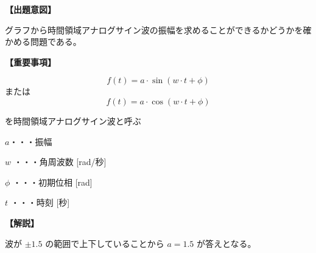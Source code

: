 \noindent \textbf{【出題意図】}

\noindent グラフから時間領域アナログサイン波の振幅を求めることができるかどうかを確かめる問題である。

\vspace{1em}
\noindent \textbf{【重要事項】}

\[
f(t) = a \cdot \sin( w \cdot t + \phi )
\]
%
\noindent または
%
\[
f(t) = a \cdot \cos( w \cdot t + \phi )
\]

\medskip
\noindent を時間領域アナログサイン波と呼ぶ

\bigskip
\noindent $a$・・・振幅

\bigskip
\noindent $w$ ・・・角周波数 [rad/秒]

\bigskip
\noindent $\phi$ ・・・初期位相 [rad]

\bigskip
\noindent $t$ ・・・時刻 [秒]

\vspace{1em}
\noindent \textbf{【解説】}

\noindent 波が $\pm 1.5$ の範囲で上下していることから $a = 1.5$ が答えとなる。

